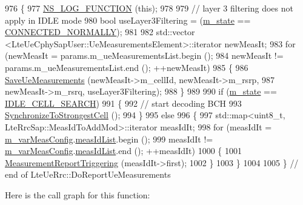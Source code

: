 \begin{DoxyCode}
976 \{
977   \hyperlink{log-macros-disabled_8h_a90b90d5bad1f39cb1b64923ea94c0761}{NS\_LOG\_FUNCTION} (\textcolor{keyword}{this});
978 
979   \textcolor{comment}{// layer 3 filtering does not apply in IDLE mode}
980   \textcolor{keywordtype}{bool} useLayer3Filtering = (\hyperlink{classns3_1_1LteUeRrc_a81d711739d758a5add38b100086be632}{m\_state} == \hyperlink{classns3_1_1LteUeRrc_a241012c291e75681150c9214e11f6145a29dc4c52bd374f1b78508fb725de9999}{CONNECTED\_NORMALLY});
981 
982   std::vector <LteUeCphySapUser::UeMeasurementsElement>::iterator newMeasIt;
983   \textcolor{keywordflow}{for} (newMeasIt = params.m\_ueMeasurementsList.begin ();
984        newMeasIt != params.m\_ueMeasurementsList.end (); ++newMeasIt)
985     \{
986       \hyperlink{classns3_1_1LteUeRrc_a8c90e4b14939e7bd7abfe09c715cf1ef}{SaveUeMeasurements} (newMeasIt->m\_cellId, newMeasIt->m\_rsrp,
987                           newMeasIt->m\_rsrq, useLayer3Filtering);
988     \}
989 
990   \textcolor{keywordflow}{if} (\hyperlink{classns3_1_1LteUeRrc_a81d711739d758a5add38b100086be632}{m\_state} == \hyperlink{classns3_1_1LteUeRrc_a241012c291e75681150c9214e11f6145ada8bc860af077feadad3e3ab250cc942}{IDLE\_CELL\_SEARCH})
991     \{
992       \textcolor{comment}{// start decoding BCH}
993       \hyperlink{classns3_1_1LteUeRrc_a4ae3c615baa5a37f7f8b24c44c5b19e3}{SynchronizeToStrongestCell} ();
994     \}
995   \textcolor{keywordflow}{else}
996     \{
997       std::map<uint8\_t, LteRrcSap::MeasIdToAddMod>::iterator measIdIt;
998       \textcolor{keywordflow}{for} (measIdIt = \hyperlink{classns3_1_1LteUeRrc_a27a7773eedfdab964d2514d9eeb1c562}{m\_varMeasConfig}.\hyperlink{structns3_1_1LteUeRrc_1_1VarMeasConfig_aa7ad91f943892cec48ffa9a5ae872e8c}{measIdList}.begin ();
999            measIdIt != \hyperlink{classns3_1_1LteUeRrc_a27a7773eedfdab964d2514d9eeb1c562}{m\_varMeasConfig}.\hyperlink{structns3_1_1LteUeRrc_1_1VarMeasConfig_aa7ad91f943892cec48ffa9a5ae872e8c}{measIdList}.end (); ++measIdIt)
1000         \{
1001           \hyperlink{classns3_1_1LteUeRrc_a992083d5b0928a7a88882bede99afd2b}{MeasurementReportTriggering} (measIdIt->first);
1002         \}
1003     \}
1004 
1005 \} \textcolor{comment}{// end of LteUeRrc::DoReportUeMeasurements}
\end{DoxyCode}


Here is the call graph for this function\+:


